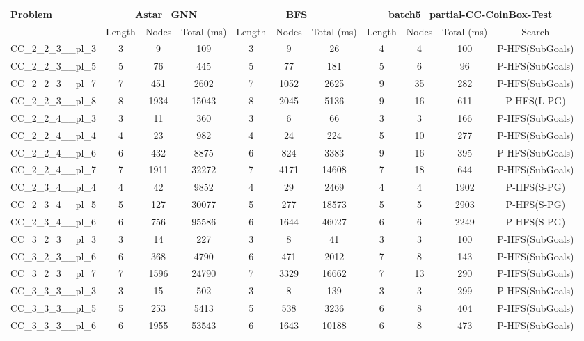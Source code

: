\begin{table}[!ht]
\centering
\scriptsize
\begin{tabular}{l|ccc|ccc|cccc}
\multirow{2}{*}{\textbf{Problem}} & \multicolumn{3}{c|}{\textbf{Astar\_GNN}} & \multicolumn{3}{c|}{\textbf{BFS}} & \multicolumn{4}{c}{\textbf{batch5\_partial-CC-CoinBox-Test}} \\
\cline{2-11}
& Length & Nodes & Total (ms) & Length & Nodes & Total (ms) & Length & Nodes & Total (ms) & Search \\
\hline
CC\_2\_2\_3\_\_pl\_3 & 3 & 9 & 109 & 3 & 9 & 26 & 4 & 4 & 100 & P-HFS(SubGoals) \\
CC\_2\_2\_3\_\_pl\_5 & 5 & 76 & 445 & 5 & 77 & 181 & 5 & 6 & 96 & P-HFS(SubGoals) \\
CC\_2\_2\_3\_\_pl\_7 & 7 & 451 & 2602 & 7 & 1052 & 2625 & 9 & 35 & 282 & P-HFS(SubGoals) \\
CC\_2\_2\_3\_\_pl\_8 & 8 & 1934 & 15043 & 8 & 2045 & 5136 & 9 & 16 & 611 & P-HFS(L-PG) \\
CC\_2\_2\_4\_\_pl\_3 & 3 & 11 & 360 & 3 & 6 & 66 & 3 & 3 & 166 & P-HFS(SubGoals) \\
CC\_2\_2\_4\_\_pl\_4 & 4 & 23 & 982 & 4 & 24 & 224 & 5 & 10 & 277 & P-HFS(SubGoals) \\
CC\_2\_2\_4\_\_pl\_6 & 6 & 432 & 8875 & 6 & 824 & 3383 & 9 & 16 & 395 & P-HFS(SubGoals) \\
CC\_2\_2\_4\_\_pl\_7 & 7 & 1911 & 32272 & 7 & 4171 & 14608 & 7 & 18 & 644 & P-HFS(SubGoals) \\
CC\_2\_3\_4\_\_pl\_4 & 4 & 42 & 9852 & 4 & 29 & 2469 & 4 & 4 & 1902 & P-HFS(S-PG) \\
CC\_2\_3\_4\_\_pl\_5 & 5 & 127 & 30077 & 5 & 277 & 18573 & 5 & 5 & 2903 & P-HFS(S-PG) \\
CC\_2\_3\_4\_\_pl\_6 & 6 & 756 & 95586 & 6 & 1644 & 46027 & 6 & 6 & 2249 & P-HFS(S-PG) \\
CC\_3\_2\_3\_\_pl\_3 & 3 & 14 & 227 & 3 & 8 & 41 & 3 & 3 & 100 & P-HFS(SubGoals) \\
CC\_3\_2\_3\_\_pl\_6 & 6 & 368 & 4790 & 6 & 471 & 2012 & 7 & 8 & 143 & P-HFS(SubGoals) \\
CC\_3\_2\_3\_\_pl\_7 & 7 & 1596 & 24790 & 7 & 3329 & 16662 & 7 & 13 & 290 & P-HFS(SubGoals) \\
CC\_3\_3\_3\_\_pl\_3 & 3 & 15 & 502 & 3 & 8 & 139 & 3 & 3 & 299 & P-HFS(SubGoals) \\
CC\_3\_3\_3\_\_pl\_5 & 5 & 253 & 5413 & 5 & 538 & 3236 & 6 & 8 & 404 & P-HFS(SubGoals) \\
CC\_3\_3\_3\_\_pl\_6 & 6 & 1955 & 53543 & 6 & 1643 & 10188 & 6 & 8 & 473 & P-HFS(SubGoals) \\

\end{tabular}
\end{table}
